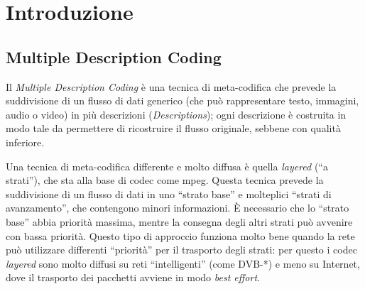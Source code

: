 

\chapter{Introduzione}

\section*{Multiple Description Coding}
Il \emph{Multiple Description Coding} è una tecnica di meta-codifica che prevede
la suddivisione di un flusso di dati generico (che può rappresentare testo,
immagini, audio o video) in più descrizioni (\emph{Descriptions}); ogni descrizione
è costruita in modo tale da permettere di ricostruire il flusso originale,
sebbene con qualità inferiore.

Una tecnica di meta-codifica differente e molto diffusa è quella \emph{layered}
(``a strati''), che sta alla base di codec come mpeg. Questa tecnica prevede la
suddivisione di un flusso di dati in uno ``strato base'' e molteplici ``strati
di avanzamento'', che contengono minori informazioni. \`E necessario che lo
``strato base'' abbia priorità massima, mentre la consegna degli altri strati
può avvenire con bassa priorità. Questo tipo di approccio funziona molto bene
quando la rete può utilizzare differenti ``priorità'' per il trasporto degli
strati: per questo i codec \emph{layered} sono molto diffusi su reti
``intelligenti'' (come DVB-*) e meno su Internet, dove il trasporto dei
pacchetti avviene in modo \emph{best effort}.






